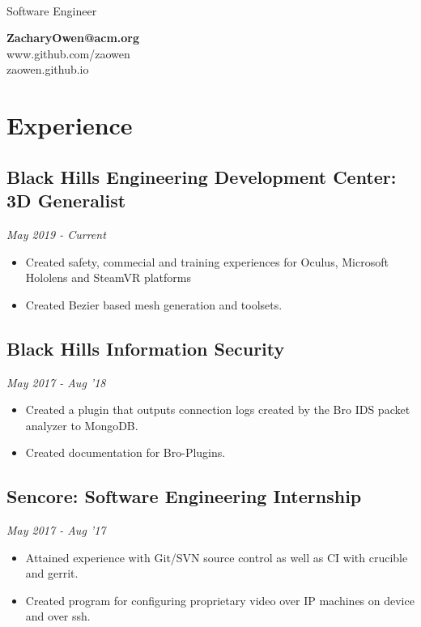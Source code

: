 \documentclass[11pt]{article}
\author{Zachary Owen}
\makeatletter
\renewcommand{\maketitle}{
\begin{multicols}{2}
\begin{flushleft}
   {\huge \bfseries
   \theauthor\\}
   {\color{red} Software Engineer}
\end{flushleft}

\columnbreak

\begin{flushright}
{\bfseries ZacharyOwen@acm.org} \\
www.github.com/zaowen \\
zaowen.github.io \\
\end{flushright}
\end{multicols}
}
\makeatother
\begin{document}
\maketitle

\section{E{\color{gray}xperience}}

\subsection{Black Hills Engineering Development Center: 3D Generalist \hfill}
{\it May 2019 - Current}
\begin{itemize}
\setlength\itemsep{-.5em}
\item Created safety, commecial and training experiences for Oculus, Microsoft Hololens and SteamVR platforms
\item Created Bezier based mesh generation and toolsets.
\end{itemize}

\subsection{Black Hills Information Security \hfill}
{\it May 2017 - Aug '18}
\begin{itemize}
\setlength\itemsep{-.5em}
\item Created a plugin that outputs connection logs created by the Bro IDS packet analyzer to MongoDB. 
\item Created documentation for Bro-Plugins.
\end{itemize}

\subsection{Sencore: Software Engineering Internship \hfill}
{\it May 2017 - Aug '17}
\begin{itemize}
\setlength\itemsep{-.5em}
\item Attained experience with Git/SVN source control as well as CI with crucible and gerrit.
\item Created program for configuring proprietary video over IP machines on device and over ssh.
\end{itemize}

\iffalse
\subsection{SDSMT Mechanical Engineering Dept \hfill}
{\it Sept 2014 - Nov '14}
\begin{itemize}
\setlength\itemsep{-.5em}
\item Ported a FORTRAN77 engine piston simulation program to the more recent Fujitsu compiler. 
\item Created front end display and management program for engine piston simulation in C\#
\end{itemize}
\fi
\end{document}
